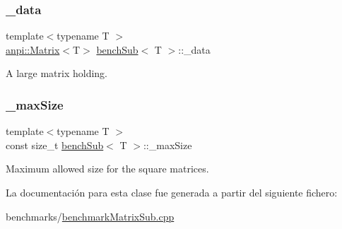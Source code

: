 \mbox{\label{classbenchSub_aba7cdacdc02143e9f9fe9511df097f89}} 
\subsubsection{\texorpdfstring{\+\_\+data}{\_data}}
{\footnotesize\ttfamily template$<$typename T $>$ \\
\hyperlink{classanpi_1_1Matrix}{anpi\+::\+Matrix}$<$T$>$ \hyperlink{classbenchSub}{bench\+Sub}$<$ T $>$\+::\+\_\+data\hspace{0.3cm}{\ttfamily [protected]}}



A large matrix holding. 

\mbox{\label{classbenchSub_a7939810564400fd0c2e26bc1d8bfb059}} 
\subsubsection{\texorpdfstring{\+\_\+max\+Size}{\_maxSize}}
{\footnotesize\ttfamily template$<$typename T $>$ \\
const size\+\_\+t \hyperlink{classbenchSub}{bench\+Sub}$<$ T $>$\+::\+\_\+max\+Size\hspace{0.3cm}{\ttfamily [protected]}}



Maximum allowed size for the square matrices. 



La documentación para esta clase fue generada a partir del siguiente fichero\+:\begin{DoxyCompactItemize}
\item 
benchmarks/\hyperlink{benchmarkMatrixSub_8cpp}{benchmark\+Matrix\+Sub.\+cpp}\end{DoxyCompactItemize}
